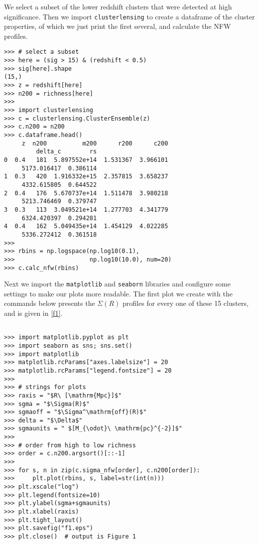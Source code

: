 \documentclass[twocolumn]{aastex6}
\newcommand{\code}{\lstinline[style=codeintext]}
\begin{document}
We select a subset of the lower redshift clusters that were detected at high significance. Then we import \code{clusterlensing} to create a dataframe of the cluster properties, of which we just print the first several, and calculate the NFW profiles.

\begin{verbatim}
>>> # select a subset
>>> here = (sig > 15) & (redshift < 0.5)
>>> sig[here].shape
(15,)
>>> z = redshift[here]
>>> n200 = richness[here]
>>> 
>>> import clusterlensing
>>> c = clusterlensing.ClusterEnsemble(z)
>>> c.n200 = n200
>>> c.dataframe.head()
     z  n200          m200      r200      c200
         delta_c        rs
0  0.4   181  5.897552e+14  1.531367  3.966101
     5173.016417  0.386114
1  0.3   420  1.916332e+15  2.357815  3.658237
     4332.615805  0.644522
2  0.4   176  5.670737e+14  1.511478  3.980218
     5213.746469  0.379747
3  0.3   113  3.049521e+14  1.277703  4.341779
     6324.420397  0.294281
4  0.4   162  5.049435e+14  1.454129  4.022285
     5336.272412  0.361518
>>>
>>> rbins = np.logspace(np.log10(0.1),
>>>                     np.log10(10.0), num=20)
>>> c.calc_nfw(rbins)
\end{verbatim}
\label{3dmf2df}


Next we import the \code{matplotlib} and \code{seaborn} libraries and configure some settings to make our plots more readable. The first plot we create with the commands below presents the $\Sigma(R)$ profiles for every one of these 15 clusters, and is given in \cref{f1}.
\begin{verbatim}

>>> import matplotlib.pyplot as plt
>>> import seaborn as sns; sns.set()
>>> import matplotlib
>>> matplotlib.rcParams["axes.labelsize"] = 20
>>> matplotlib.rcParams["legend.fontsize"] = 20
>>> 
>>> # strings for plots
>>> raxis = "$R\ [\mathrm{Mpc}]$"
>>> sgma = "$\Sigma(R)$"
>>> sgmaoff = "$\Sigma^\mathrm{off}(R)$"
>>> delta = "$\Delta$"
>>> sgmaunits = " $[M_{\odot}\ \mathrm{pc}^{-2}]$"
>>> 
>>> # order from high to low richness
>>> order = c.n200.argsort()[::-1]
>>> 
>>> for s, n in zip(c.sigma_nfw[order], c.n200[order]):
>>>     plt.plot(rbins, s, label=str(int(n)))
>>> plt.xscale("log")
>>> plt.legend(fontsize=10)
>>> plt.ylabel(sgma+sgmaunits)
>>> plt.xlabel(raxis)
>>> plt.tight_layout()
>>> plt.savefig("f1.eps")
>>> plt.close()  # output is Figure 1

\end{verbatim}
\end{document}

